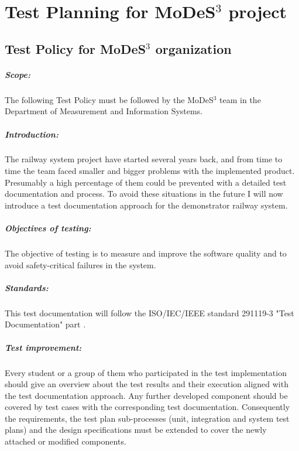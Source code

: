\chapter{Test Planning for MoDeS$^3$ project}\label{TestDoc:MODES}

\section{Test Policy for MoDeS$^3$ organization}
\paragraph{Scope:} The following Test Policy must be followed by the MoDeS$^3$ team in the Department of Measurement and Information Systems.
\paragraph{Introduction:} The railway system project have started several years back, and from time to time the team faced smaller and bigger problems with the implemented product. Presumably a high percentage of them could be prevented with a detailed test documentation and process. To avoid these situations in the future I will now introduce a test documentation approach for the demonstrator railway system.
\paragraph{Objectives of testing:} The objective of testing is to measure and improve the software quality and to avoid safety-critical failures in the system.
\paragraph{Standards:} This test documentation will follow the ISO/IEC/IEEE standard 291119-3 "Test Documentation" part \cite{IEEE13}.
\paragraph{Test improvement:} Every student or a group of them who participated in the test implementation should give an overview about the test results and their execution aligned with the test documentation approach. Any further developed component should be covered by test cases with the corresponding test documentation. Consequently the requirements, the test plan sub-processes (unit, integration and system test plans) and the design specifications must be extended to cover the newly attached or modified components.

